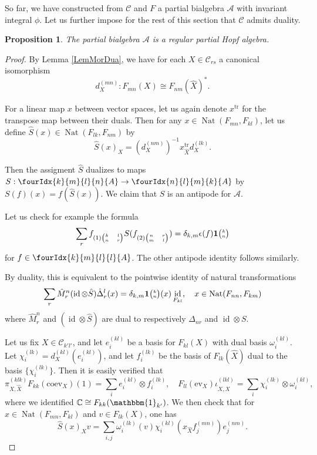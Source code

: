 \documentclass[10pt]{article}
\DeclareMathOperator{\id}{id}
\DeclareMathOperator{\Nat}{\mathrm{Nat}}
\DeclareMathOperator{\tr}{\mathrm{tr}}
\newcommand{\n}{\mathfrak{n}}
\newcommand{\C}{\mathbb{C}}
\newcommand{\CatC}{\mathcal{C}}
\newcommand{\CatCC}{\mathscr{C}}
\newcommand{\ev}{\mathrm{ev}}
\newcommand{\coev}{\mathrm{coev}}
\newcommand{\Grt}[3]{#1{\tiny {\begin{pmatrix} #2\\#3\end{pmatrix}}}}
\newcommand{\Unitb}{\mathbbm{1}}
\newcommand{\UnitC}[2]{\Grt{\mathbf{1}}{#1}{#2}}
\newcommand{\Gr}[5]{\fourIdx{#2}{#4}{#3}{#5}{#1}}%
\newtheorem{Prop}[Theorem]{Proposition}
\theoremstyle{definition}
\numberwithin{equation}{section}
\begin{document}
So far, we have constructed from $\CatCC$ and $F$ a partial bialgebra $\mathscr{A}$ with invariant integral $\phi$. Let us further impose for the rest of this section that $\CatCC$ admits duality.

\begin{Prop}\label{PropAnti} The partial bialgebra $\mathscr{A}$ is a regular partial Hopf algebra.
\end{Prop} 

\begin{proof} By Lemma \ref{LemMorDua}, we have for each $X\in \CatC_{rs}$ a canonical isomorphism \[d^{(mn)}_X:F_{mn}(X) \cong F_{nm}(\hat{X})^*.\] 

For a linear map $x$ between vector spaces, let us again denote $x^{\tr}$ for the transpose map between their duals. Then for any $x\in \Nat(F_{mn},F_{kl})$, let us define $\hat{S}(x) \in \Nat(F_{lk},F_{nm})$ by \[\hat{S}(x)_X = \left(d^{(nm)}_X\right)^{-1} x_{\hat{X}}^{\tr} d_X^{(lk)}.\] 

Then the assigment $\hat{S}$ dualizes to maps $S:\Gr{A}{k}{l}{m}{n} \rightarrow \Gr{A}{n}{m}{l}{k}$ by $S(f)(x) = f(\hat{S}(x))$. We claim that $S$ is an antipode for $\mathscr{A}$. 

Let us check for example the formula \[\sum_r f_{(1){\tiny \begin{pmatrix}k&l\\n & r\end{pmatrix}}} S(f_{(2){\tiny \begin{pmatrix} n & r \\ m & l\end{pmatrix}}}) = \delta_{k,m}\epsilon(f)\UnitC{k}{n}\] for $f\in \Gr{A}{k}{l}{m}{l}$. The other antipode identity follows similarly.

By duality, this is equivalent to the pointwise identity of natural transformations \[\sum_r\hat{M}^n_r(\id\otimes \hat{S})\hat{\Delta}^l_r(x) = \delta_{k,m}\UnitC{k}{n}(x) \id_{F_{kl}},\quad x\in \Nat(F_{nn},F_{km})\] where $\hat{M}^n_r$ and $(\id\otimes \hat{S})$ are dual to respectively $\Delta_{nr}$ and $\id\otimes S$. 

Let us fix $X\in \mathcal{C}_{k'l'}$, and let $e_i^{(kl)}$ be a basis for $F_{kl}(X)$ with dual basis $\omega_i^{(kl)}$. Let $\chi_i^{(lk)} = d_X^{(kl)}(e_i^{(kl)})$, and let $f_i^{(lk)}$ be the basis of $F_{lk}(\hat{X})$ dual to the basis $\{\chi_i^{(lk)}\}$. Then it is easily verified that \[\pi^{(klk)}_{X,\hat{X}}F_{kk}(\coev_{X})(1) = \sum_i e_i^{(kl)}\otimes f_i^{(lk)},\quad F_{ll}(\ev_X)\iota^{(lkl)}_{\hat{X},X} = \sum_i \chi_i^{(lk)}\otimes \omega_i^{(kl)},\] where we identified $\C\cong F_{kk}(\Unitb_{k'})$. We then check that for $x\in \Nat(F_{mn},F_{kl})$ and $v\in F_{lk}(X)$, one has \[\hat{S}(x)_Xv = \sum_{i,j} \omega_i^{(lk)}(v)\chi_i^{(kl)}(x_{\hat{X}}f_j^{(mn)})e_j^{(nm)}.\] 



\end{proof}
\end{document}
